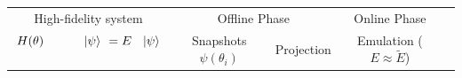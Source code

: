 \documentclass[10pt, margin=1mm,convert={density=500,outext=.png}]{standalone}
\begin{document}
\small
\begin{tabular}{ccccc}
\toprule

High-fidelity system  & \multicolumn{2}{c}{Offline Phase} & Online Phase\\
\cmidrule(lr){1-1}\cmidrule(lr){2-3}\cmidrule(lr){4-4}

\hspace{0.45in}$H(\theta)\hspace{0.43in}\ket{\psi}\hspace{0.05in}=E\hspace{0.06in}~\ket{\psi}$~
&
\!\!\!\!Snapshots $\psi(\theta_i)$\!\!\!\!\!\!\!\!\!\!
& Projection
& Emulation ($E \approx \widetilde E$)
\\



\end{tabular}
\end{document}
